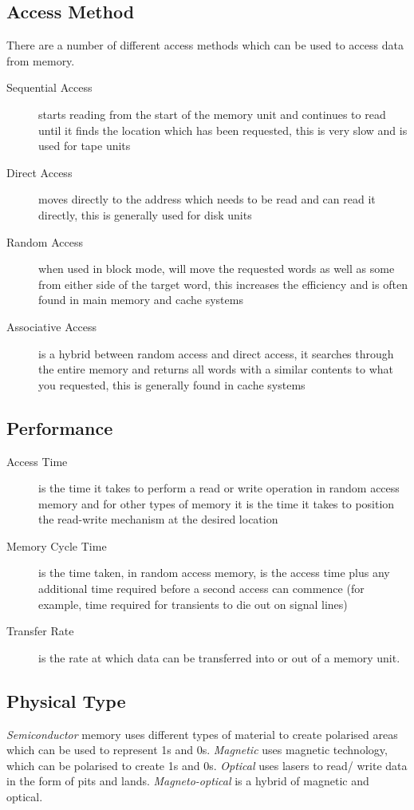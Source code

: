\subsection*{Access Method}
There are a number of different access methods which can be used to access data from memory. 
\begin{description}
    \item[Sequential Access] starts reading from the start of the memory unit and continues to read until it finds the location which has been requested, this is very slow and is used for tape units
    \item[Direct Access] moves directly to the address which needs to be read and can read it directly, this is generally used for disk units
    \item[Random Access] when used in block mode, will move the requested words as well as some from either side of the target word, this increases the efficiency and is often found in main memory and cache systems
    \item[Associative Access] is a hybrid between random access and direct access, it searches through the entire memory and returns all words with a similar contents to what you requested, this is generally found in cache systems
\end{description}

\subsection*{Performance}
\begin{description}
    \item[Access Time] is the time it takes to perform a read or write operation in random access memory and for other types of memory it is the time it takes to position the read-write mechanism at the desired location
    \item[Memory Cycle Time] is the time taken, in random access memory, is the access time plus any additional time required before a second access can commence (for example, time required for transients to die out on signal lines)
    \item[Transfer Rate] is the rate at which data can be transferred into or out of a memory unit. 
\end{description}
\subsection*{Physical Type}
\textit{Semiconductor} memory uses different types of material to create polarised areas which can be used to represent 1s and 0s. \textit{Magnetic} uses magnetic technology, which can be polarised to create 1s and 0s. \textit{Optical} uses lasers to read/ write data in the form of pits and lands. \textit{Magneto-optical} is a hybrid of magnetic and optical.

